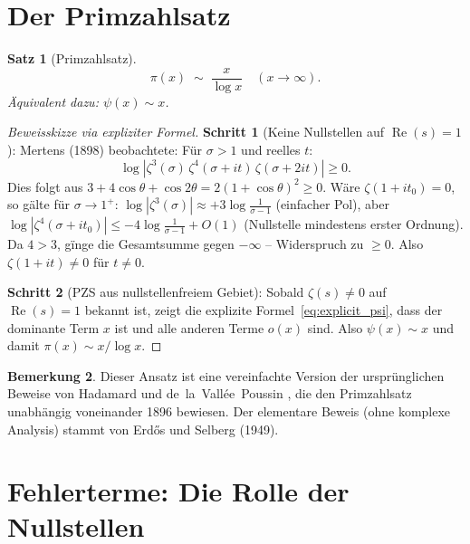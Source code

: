 \documentclass[12pt,a4paper]{amsart}
\newtheorem{theorem}{Satz}[section]
\theoremstyle{definition}
\newtheorem{remark}[theorem]{Bemerkung}
\DeclareMathOperator{\Re}{Re}
\begin{document}
\section{Der Primzahlsatz}

\begin{theorem}[Primzahlsatz]
\label{thm:pnt}
\[
  \pi(x) \;\sim\; \frac{x}{\log x} \quad (x \to \infty).
\]
\"Aquivalent dazu: $\psi(x) \sim x$.
\end{theorem}

\begin{proof}[Beweisskizze via expliziter Formel]
\textbf{Schritt 1} (Keine Nullstellen auf $\Re(s) = 1$):
Mertens (1898) beobachtete: F\"ur $\sigma > 1$ und reelles $t$:
\[
  \log|\zeta^3(\sigma)\,\zeta^4(\sigma+it)\,\zeta(\sigma+2it)| \ge 0.
\]
Dies folgt aus $3 + 4\cos\theta + \cos 2\theta = 2(1+\cos\theta)^2 \ge 0$.
W\"are $\zeta(1+it_0) = 0$, so g\"alte f\"ur $\sigma \to 1^+$:
$\log|\zeta^3(\sigma)| \approx +3\log\tfrac{1}{\sigma-1}$ (einfacher Pol),
aber $\log|\zeta^4(\sigma+it_0)| \le -4\log\tfrac{1}{\sigma-1} + O(1)$
(Nullstelle mindestens erster Ordnung).
Da $4 > 3$, g\"inge die Gesamtsumme gegen $-\infty$ -- Widerspruch zu $\ge 0$.
Also $\zeta(1+it) \ne 0$ f\"ur $t \ne 0$.

\textbf{Schritt 2} (PZS aus nullstellenfreiem Gebiet):
Sobald $\zeta(s) \ne 0$ auf $\Re(s) = 1$ bekannt ist, zeigt die explizite
Formel~\eqref{eq:explicit_psi}, dass der dominante Term $x$ ist
und alle anderen Terme $o(x)$ sind.
Also $\psi(x) \sim x$ und damit $\pi(x) \sim x/\log x$.
\end{proof}

\begin{remark}
Dieser Ansatz ist eine vereinfachte Version der urspr\"unglichen Beweise
von Hadamard \cite{Hadamard1896} und de~la~Vall\'ee~Poussin \cite{Poussin1896},
die den Primzahlsatz unabh\"angig voneinander 1896 bewiesen.
Der elementare Beweis (ohne komplexe Analysis) stammt von
Erd\H{o}s und Selberg (1949).
\end{remark}

\section{Fehlerterme: Die Rolle der Nullstellen}
\end{document}
